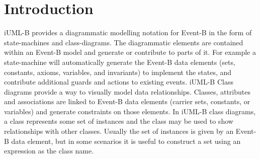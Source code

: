 \section{Introduction}
\label{sec:iumlb-introduction}

iUML-B provides a diagrammatic modelling notation for Event-B in the form of state-machines and class-diagrams. The diagrammatic elements are contained within an Event-B model and generate or contribute to parts of it. For example a state-machine will automatically generate the Event-B data elements (sets, constants, axioms, variables, and invariants) to implement the states, and contribute additional guards and actions to existing events. iUML-B Class diagrams provide a way to visually model data relationships.  Classes, attributes and associations are linked to Event-B data elements (carrier sets, constants, or variables) and generate constraints on those elements.  In iUML-B class diagrams, a class represents some set of instances and the class may be used to show relationships with other classes. Usually the set of instances is given by an Event-B data element, but in some scenarios it is useful to construct a set using an expression as the class name.


